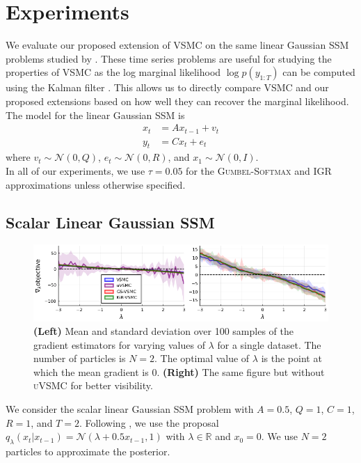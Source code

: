 \documentclass[12pt]{article}
\newcommand{\vsmc}{\textsc{VSMC}\xspace}
\newcommand{\uvsmc}{\textsc{uVSMC}\xspace}
\newcommand{\gumbelsoftmax}{\textsc{Gumbel-Softmax}\xspace}
\newcommand{\igr}{\textsc{IGR}\xspace}
\newcommand{\ssm}{\textsc{SSM}\xspace}
\begin{document}
\section{Experiments}\label{sec:experiments}

We evaluate our proposed extension of \vsmc on the same linear Gaussian \ssm problems studied by \textcite{Naesseth:2018}. These time series problems are useful for studying the properties of \vsmc as the log marginal likelihood $\log p(y_{1:T})$ can be computed using the Kalman filter \parencite{Jong:1988}. This allows us to directly compare \vsmc and our proposed extensions based on how well they can recover the marginal likelihood. The model for the linear Gaussian \ssm is
\begin{align*}
x_t &= Ax_{t-1} + v_t \\
y_t &= Cx_t + e_t
\end{align*}
where $v_t\sim\mathcal{N}(0,Q)$, $e_t\sim\mathcal{N}(0,R)$, and $x_1\sim\mathcal{N}(0,I)$.
\\

In all of our experiments, we use $\tau=0.05$ for the \gumbelsoftmax and \igr approximations unless otherwise specified.

\subsection{Scalar Linear Gaussian \ssm}

\begin{figure}[t]
\centering
\includegraphics[width=\textwidth]{figures/grad_est_var.png}
\caption{\textbf{(Left)} Mean and standard deviation over 100 samples of the gradient estimators for varying values of $\lambda$ for a single dataset. The number of particles is $N=2$. The optimal value of $\lambda$ is the point at which the mean gradient is 0. \textbf{(Right)} The same figure but without \uvsmc for better visibility.}
\label{fig:grad_est_var}
\end{figure}

We consider the scalar linear Gaussian \ssm problem with $A=0.5$, $Q=1$, $C=1$, $R=1$, and $T=2$. Following \textcite{Naesseth:2018}, we use the proposal $q_\lambda(x_t|x_{t-1}) = \mathcal{N}(\lambda+0.5x_{t-1}, 1)$ with $\lambda\in\mathbb{R}$ and $x_0=0$. We use $N=2$ particles to approximate the posterior.
\\
\end{document}
